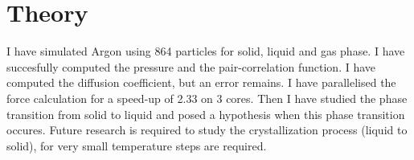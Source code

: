 \section{Theory}
I have simulated Argon using 864 particles for solid, liquid and gas phase.
I have succesfully computed the pressure and the pair-correlation function. I
have computed the diffusion coefficient, but an error remains. I have
parallelised the force calculation for a speed-up of 2.33 on 3 cores. Then I
have studied the phase transition from solid to liquid and posed a hypothesis
when this phase transition occures.
Future research is required to study the crystallization process (liquid to
solid), for very small temperature steps are required.